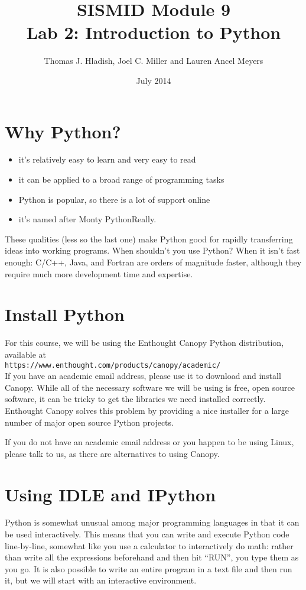 \documentclass{article}
\begin{document}
\title{SISMID Module 9\\Lab 2: Introduction to Python}
\author{Thomas J. Hladish, Joel C. Miller and Lauren Ancel Meyers}
\date{July 2014}
\maketitle

\section*{Why Python?}
\begin{itemize}
\item it's relatively easy to learn and very easy to read
\item it can be applied to a broad range of programming tasks
\item Python is popular, so there is a lot of support online
\item it's named after Monty Python\textemdash Really.
\end{itemize}

These qualities (less so the last one) make Python good for rapidly transferring ideas into working programs.  When shouldn't you use Python?  When it
isn't fast enough: C/C++, Java, and Fortran are orders of magnitude faster, although they require much more development time and expertise.

\section*{Install Python}

For this course, we will be using the Enthought Canopy Python distribution, available at\\

\texttt{https://www.enthought.com/products/canopy/academic/}\\

If you have an academic email address, please use it to download and install Canopy.
While all of the necessary software we will be using is free, open source software, it can
be tricky to get the libraries we need installed correctly. Enthought Canopy solves this problem 
by providing a nice installer for a large number of major open source Python projects.

If you do not have an academic email address or you happen to be using Linux, please talk to us,
as there are alternatives to using Canopy.

\section{Using IDLE and IPython}
Python is somewhat unusual among major programming languages in that it can be used interactively.
This means that you can write and execute Python code line-by-line, somewhat like you use a calculator to
interactively do math: rather than write all the expressions beforehand and then
hit ``RUN'', you type them as you go.  It is also possible to write an entire program in a text file and then
run it, but we will start with an interactive environment.
\end{document}
